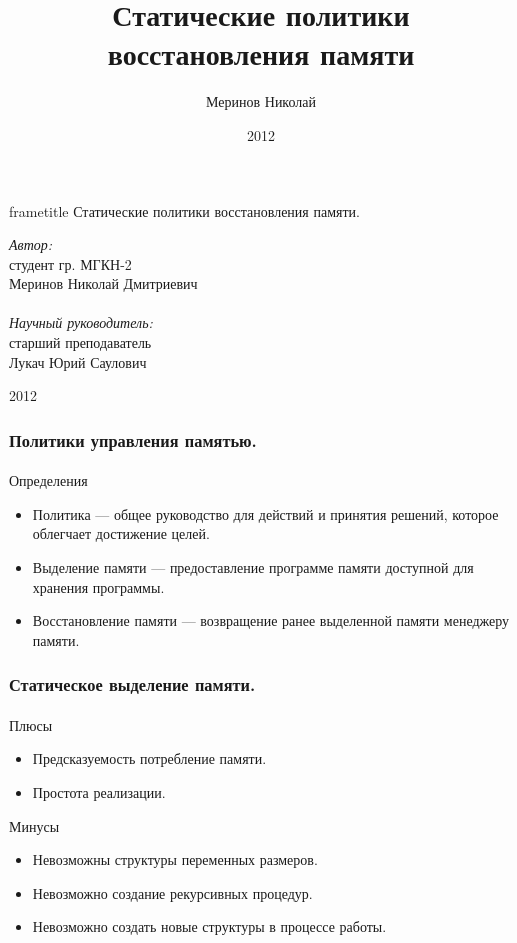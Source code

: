 \documentclass[ucs]{beamer}
\title[Управление памятью]{Статические политики восстановления памяти}
\author{Меринов Николай}
\institute{УрФУ}
\date{2012}
\begin{document}

\begin{frame}
  \begin{beamercolorbox}[ht=2.5ex,dp=1ex,center,rounded=true,shadow=true]%
    {frametitle}
    Статические политики восстановления памяти.
  \end{beamercolorbox}
  \begin{flushright} \large
    \emph{Автор:} \\
    студент гр. МГКН-2\\
    Меринов Николай Дмитриевич\\\ \\
    \emph{Научный руководитель:} \\
    старший преподаватель\\
    Лукач Юрий Саулович
  \end{flushright}
  \vfill
  \begin{center}
    {2012}
  \end{center}
\end{frame}

\begin{frame}[fragile]
  \frametitle{Политики управления памятью.}
  \framesubtitle{}
  \begin{block}{Определения}
    \begin{itemize}
    \item Политика --- общее руководство для действий и принятия решений,
      которое облегчает достижение целей. %
    \item Выделение памяти --- предоставление программе памяти доступной для
      хранения программы.
    \item Восстановление памяти --- возвращение ранее выделенной памяти
      менеджеру памяти.
    \end{itemize}
  \end{block}
\end{frame}

\begin{frame}[fragile]
  \frametitle{Статическое выделение памяти.}
  \framesubtitle{}
  \begin{block}{Плюсы}
    \begin{itemize}
    \item Предсказуемость потребление памяти.
    \item Простота реализации.
    \end{itemize}
  \end{block}

  \begin{block}{Минусы}
    \begin{itemize}
    \item Невозможны структуры переменных размеров.
    \item Невозможно создание рекурсивных процедур.
    \item Невозможно создать новые структуры в процессе работы.
    \end{itemize}
  \end{block}
\end{frame}
\end{document}
